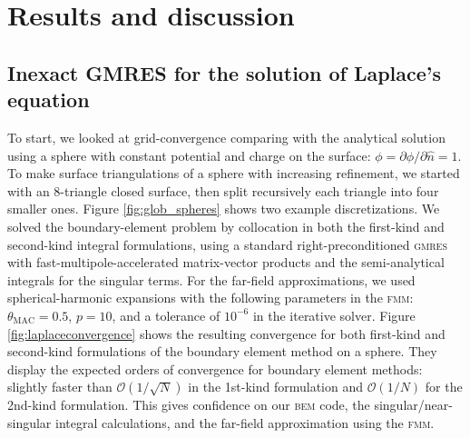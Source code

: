 \documentclass[final,leqno,]{siamltex1213}
\newcommand{\bem}{\textsc{bem}\xspace}
\newcommand{\fmm}{\textsc{fmm}\xspace}
\renewcommand{\O}[1]{\mathcal{O}(#1)}
\newcommand{\gmres}{\textsc{gmres}\xspace}
\newcommand{\partialdi}[2]{\partial #1 / \partial #2}
\newcommand{\nhat}{\hat{n}}
\begin{document}
\section{Results and discussion}

\subsection{Inexact {\small GMRES} for the solution of Laplace's equation}
To start, we looked at grid-convergence comparing with the analytical solution using a sphere with constant potential and charge on the surface: $\phi = \partialdi{\phi}{\nhat} = 1$. To make surface triangulations of a sphere with increasing refinement, we started with an 8-triangle closed surface, then split recursively each triangle into four smaller ones. Figure \ref{fig:glob_spheres} shows two example discretizations. We solved the boundary-element problem by collocation in both the first-kind and second-kind integral formulations, using a standard right-preconditioned \gmres with fast-multipole-accelerated matrix-vector products and the semi-analytical integrals for the singular terms. For the far-field approximations, we used spherical-harmonic expansions with the following parameters in the \fmm: $\theta_{\text{MAC}} = 0.5$, $p = 10$, and a tolerance of $10^{-6}$ in the iterative solver. 
Figure \ref{fig:laplaceconvergence} shows the resulting convergence for both first-kind and second-kind formulations of the boundary element method on a sphere. They display the expected orders of convergence for boundary element methods: slightly faster than $\O{1/\sqrt{N}}$ in the 1st-kind formulation and $\O{1/N}$ for the 2nd-kind formulation. This gives confidence on our \bem code, the singular/near-singular integral calculations, and the far-field approximation using the \fmm.
\end{document}
